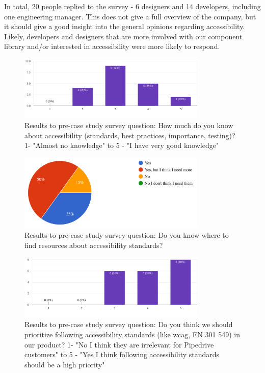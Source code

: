 \documentclass{master_thesis}
\begin{document}
In total, 20 people replied to the survey - 6 designers and 14 developers, including one engineering manager. This does not give a full overview of the company, but it should give a good insight into the general opinions regarding accessibility. Likely, developers and designers that are more involved with our component library and/or interested in accessibility were more likely to respond.

\begin{figure}[H]
    \centering
    \includegraphics[width=0.8\textwidth]{img/a11y-knowledge.png}
    \caption{Results to pre-case study survey question: How much do you know about accessibility (standards, best practices, importance, testing)? 1- "Almost no knowledge" to 5 - "I have very good knowledge" }
    \label{fig:a11y-knowledge}
\end{figure}

\begin{figure}[H]
    \centering
    \includegraphics[width=0.8\textwidth]{img/a11y-resources.png}
    \caption{Results to pre-case study survey question: Do you know where to find resources about accessibility standards? }
    \label{fig:a11y-resources}
\end{figure}

\begin{figure}[H]
    \centering
    \includegraphics[width=0.8\textwidth]{img/a11y-priority.png}
    \caption{Results to pre-case study survey question: Do you think we should prioritize following accessibility standards (like \ac{wcag}, EN 301 549) in our product? 1- "No I think they are irrelevant for Pipedrive customers" to 5 - "Yes I think following accessibility standards should be a high priority" }
    \label{fig:a11y-priority}
\end{figure}
\end{document}
